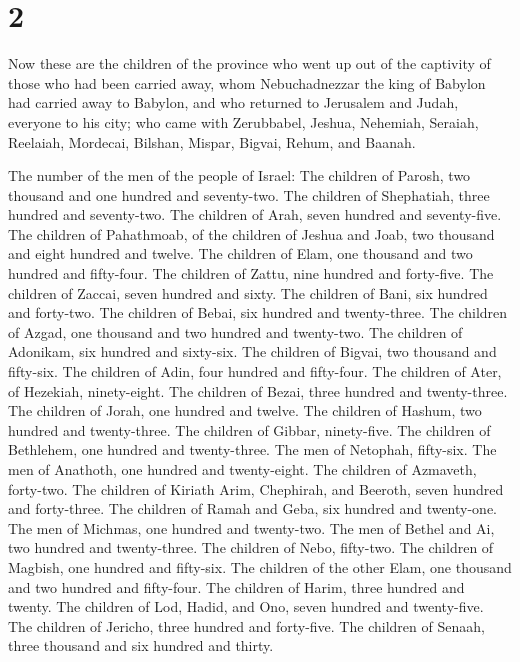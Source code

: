 \hypertarget{section-1}{%
\section{2}\label{section-1}}

 Now these are the children of the province who went up
out of the captivity of those who had been carried away, whom
Nebuchadnezzar the king of Babylon had carried away to Babylon, and who
returned to Jerusalem and Judah, everyone to his city; 
who came with Zerubbabel, Jeshua, Nehemiah, Seraiah, Reelaiah, Mordecai,
Bilshan, Mispar, Bigvai, Rehum, and Baanah.

The number of the men of the people of Israel:  The
children of Parosh, two thousand and one hundred and seventy-two.
 The children of Shephatiah, three hundred and
seventy-two.  The children of Arah, seven hundred and
seventy-five.  The children of Pahathmoab, of the children
of Jeshua and Joab, two thousand and eight hundred and twelve.
 The children of Elam, one thousand and two hundred and
fifty-four.  The children of Zattu, nine hundred and
forty-five.  The children of Zaccai, seven hundred and
sixty.  The children of Bani, six hundred and forty-two.
 The children of Bebai, six hundred and twenty-three.
 The children of Azgad, one thousand and two hundred and
twenty-two.  The children of Adonikam, six hundred and
sixty-six.  The children of Bigvai, two thousand and
fifty-six.  The children of Adin, four hundred and
fifty-four.  The children of Ater, of Hezekiah,
ninety-eight.  The children of Bezai, three hundred and
twenty-three.  The children of Jorah, one hundred and
twelve.  The children of Hashum, two hundred and
twenty-three.  The children of Gibbar, ninety-five.
 The children of Bethlehem, one hundred and twenty-three.
 The men of Netophah, fifty-six.  The men
of Anathoth, one hundred and twenty-eight.  The children
of Azmaveth, forty-two.  The children of Kiriath Arim,
Chephirah, and Beeroth, seven hundred and forty-three. 
The children of Ramah and Geba, six hundred and twenty-one.
 The men of Michmas, one hundred and twenty-two.
 The men of Bethel and Ai, two hundred and twenty-three.
 The children of Nebo, fifty-two.  The
children of Magbish, one hundred and fifty-six.  The
children of the other Elam, one thousand and two hundred and fifty-four.
 The children of Harim, three hundred and twenty.
 The children of Lod, Hadid, and Ono, seven hundred and
twenty-five.  The children of Jericho, three hundred and
forty-five.  The children of Senaah, three thousand and
six hundred and thirty.

